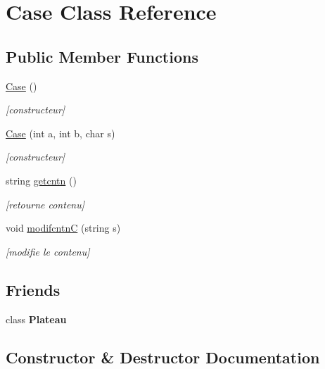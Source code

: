 \hypertarget{class_case}{}\section{Case Class Reference}
\label{class_case}
\subsection*{Public Member Functions}
\begin{DoxyCompactItemize}
\item 
\hyperlink{class_case_a14237e17aab1829965adab76b747db6c}{Case} ()
\begin{DoxyCompactList}\small\item\em \mbox{[}constructeur\mbox{]} \end{DoxyCompactList}\item 
\hyperlink{class_case_aaa201d6333e73a7fbd8848ecd7c30677}{Case} (int a, int b, char s)
\begin{DoxyCompactList}\small\item\em \mbox{[}constructeur\mbox{]} \end{DoxyCompactList}\item 
string \hyperlink{class_case_ae54984ba4aa72ccab19b5cce893cc6f2}{getcntn} ()
\begin{DoxyCompactList}\small\item\em \mbox{[}retourne contenu\mbox{]} \end{DoxyCompactList}\item 
void \hyperlink{class_case_a13cb9d8edd99d9f0f5a9ce0c2fb80ce2}{modifcntnC} (string s)
\begin{DoxyCompactList}\small\item\em \mbox{[}modifie le contenu\mbox{]} \end{DoxyCompactList}\end{DoxyCompactItemize}
\subsection*{Friends}
\begin{DoxyCompactItemize}
\item 
class {\bfseries Plateau}\hypertarget{class_case_a1e864baae10efddb59490b032ba7e0d5}{}\label{class_case_a1e864baae10efddb59490b032ba7e0d5}

\end{DoxyCompactItemize}


\subsection{Constructor \& Destructor Documentation}
